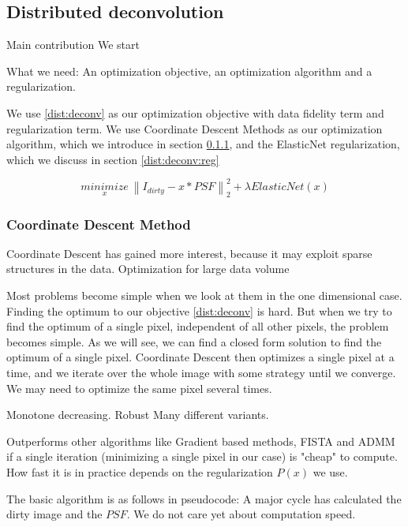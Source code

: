\subsection{Distributed deconvolution}

Main contribution
We start 

What we need: An optimization objective, an optimization algorithm and a regularization. 

We use \eqref{dist:deconv} as our optimization objective with data fidelity term and regularization term. We use Coordinate Descent Methods as our optimization algorithm, which we introduce in section \ref{dist:deconv:cd}, and the ElasticNet regularization, which we discuss in section \ref{dist:deconv:reg}

\begin{equation}\label{dist:deconv}
\underset{x}{minimize} \: \left \| I_{dirty} - x * PSF \right \|_2^2 + \lambda ElasticNet(x)
\end{equation}



\subsubsection{Coordinate Descent Method}\label{dist:deconv:cd}
Coordinate Descent has gained more interest, because it may exploit sparse structures in the data.
Optimization for large data volume\cite{richtarik2016distributed}

Most problems become simple when we look at them in the one dimensional case. Finding the optimum to our objective \eqref{dist:deconv} is hard. But when we try to find the optimum of a single pixel, independent of all other pixels, the problem becomes simple. As we will see, we can find a closed form solution to find the optimum of a single pixel.
Coordinate Descent then optimizes a single pixel at a time, and we iterate over the whole image with some strategy until we converge. We may need to optimize the same pixel several times.

Monotone decreasing.
Robust
Many different variants.

Outperforms other algorithms like Gradient based methods, FISTA and ADMM if a single iteration (minimizing a single pixel in our case) is "cheap" to compute. 
How fast it is in practice depends on the regularization $P(x)$ we use.

The basic algorithm is as follows in pseudocode: A major cycle has calculated the dirty image and the $PSF$. We do not care yet about computation speed.

